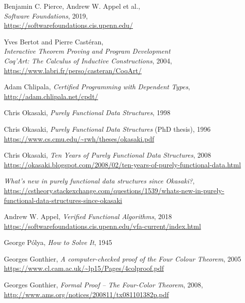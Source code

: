 \documentclass[declaration,mgr,english,shortabstract]{iithesis}
\begin{document}
\begin{thebibliography}{1}
    Benjamin C. Pierce, Andrew W. Appel et al., \\
    \textit{Software Foundations}, 2019, \\
    \url{https://softwarefoundations.cis.upenn.edu/}

    Yves Bertot and Pierre Castéran, \\
    \textit{Interactive Theorem Proving and Program Development \\ Coq'Art: The Calculus of Inductive Constructions}, 2004, \\
    \url{https://www.labri.fr/perso/casteran/CoqArt/}

    Adam Chlipala,
    \textit{Certified Programming with Dependent Types}, \\
    \url{http://adam.chlipala.net/cpdt/}

    Chris Okasaki,
    \textit{Purely Functional Data Structures}, 1998

    Chris Okasaki,
    \textit{Purely Functional Data Structures} (PhD thesis), 1996 \\
    \url{https://www.cs.cmu.edu/~rwh/theses/okasaki.pdf}

    Chris Okasaki,
    \textit{Ten Years of Purely Functional Data Structures}, 2008 \\
    \url{https://okasaki.blogspot.com/2008/02/ten-years-of-purely-functional-data.html}

    \textit{What's new in purely functional data structures since Okasaki?}, \\
    \url{https://cstheory.stackexchange.com/questions/1539/whats-new-in-purely-functional-data-structures-since-okasaki}

    Andrew W. Appel,
    \textit{Verified Functional Algorithms}, 2018 \\
    \url{https://softwarefoundations.cis.upenn.edu/vfa-current/index.html}

    George Pólya, \textit{How to Solve It}, 1945

    Georges Gonthier,
    \textit{A computer-checked proof of the Four Colour Theorem}, 2005 \\
    \url{https://www.cl.cam.ac.uk/~lp15/Pages/4colproof.pdf}

    Georges Gonthier,
    \textit{Formal Proof -- The Four-Color Theorem}, 2008, \\
    \url{http://www.ams.org/notices/200811/tx081101382p.pdf}


\end{thebibliography}
\end{document}
